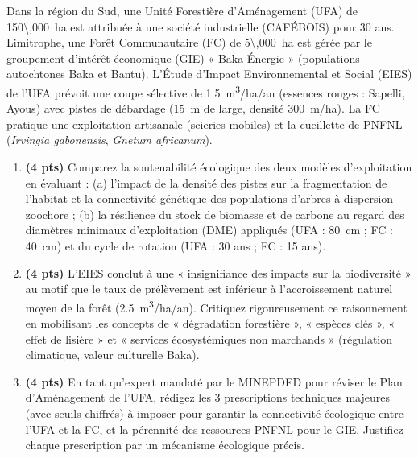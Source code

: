 \documentclass[11pt]{article}
\begin{document}
\begin{exercice}
Dans la région du Sud, une Unité Forestière d'Aménagement (UFA) de \SI{150\,000}{ha} est attribuée à une société industrielle (CAFÉBOIS) pour 30 ans. Limitrophe, une Forêt Communautaire (FC) de \SI{5\,000}{ha} est gérée par le groupement d'intérêt économique (GIE) « Baka Énergie » (populations autochtones Baka et Bantu). L'Étude d'Impact Environnemental et Social (EIES) de l'UFA prévoit une coupe sélective de \SI{1,5}{m^3/ha/an} (essences rouges : Sapelli, Ayous) avec pistes de débardage (\SI{15}{m} de large, densité \SI{300}{m/ha}). La FC pratique une exploitation artisanale (scieries mobiles) et la cueillette de PNFNL (\textit{Irvingia gabonensis}, \textit{Gnetum africanum}).

\begin{enumerate}
\item \textbf{(4 pts)} Comparez la soutenabilité écologique des deux modèles d'exploitation en évaluant : (a) l'impact de la densité des pistes sur la fragmentation de l'habitat et la connectivité génétique des populations d'arbres à dispersion zoochore ; (b) la résilience du stock de biomasse et de carbone au regard des diamètres minimaux d'exploitation (DME) appliqués (UFA : \SI{80}{cm} ; FC : \SI{40}{cm}) et du cycle de rotation (UFA : 30 ans ; FC : 15 ans).
\item \textbf{(4 pts)} L'EIES conclut à une « insignifiance des impacts sur la biodiversité » au motif que le taux de prélèvement est inférieur à l'accroissement naturel moyen de la forêt (\SI{2,5}{m^3/ha/an}). Critiquez rigoureusement ce raisonnement en mobilisant les concepts de « dégradation forestière », « espèces clés », « effet de lisière » et « services écosystémiques non marchands » (régulation climatique, valeur culturelle Baka).
\item \textbf{(4 pts)} En tant qu'expert mandaté par le MINEPDED pour réviser le Plan d'Aménagement de l'UFA, rédigez les 3 prescriptions techniques majeures (avec seuils chiffrés) à imposer pour garantir la connectivité écologique entre l'UFA et la FC, et la pérennité des ressources PNFNL pour le GIE. Justifiez chaque prescription par un mécanisme écologique précis.
\end{enumerate}
\end{exercice}
\end{document}

